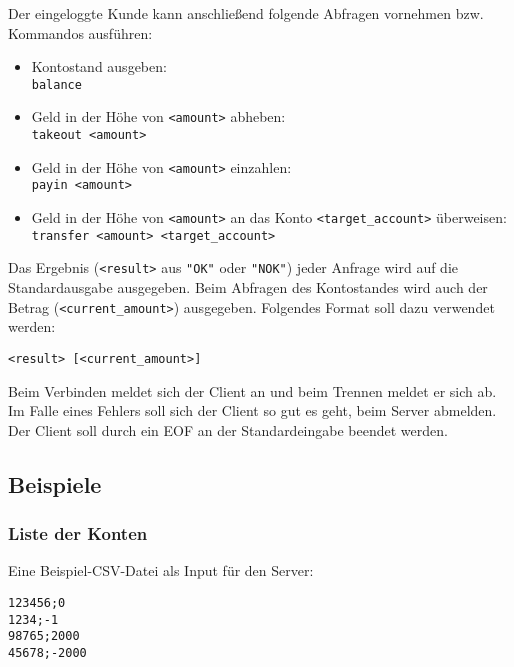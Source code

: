Der eingeloggte Kunde kann anschließend folgende Abfragen vornehmen
bzw. Kommandos ausführen:
\begin{itemize}
\item Kontostand ausgeben:\\
  \texttt{balance}
\item Geld in der Höhe von \texttt{<amount>} abheben:\\
  \texttt{takeout <amount>}
\item Geld in der Höhe von \texttt{<amount>} einzahlen:\\
  \texttt{payin <amount>}
\item Geld in der Höhe von \texttt{<amount>} an das Konto
  \verb|<target_account>| überweisen:\\
  \verb|transfer <amount> <target_account>|
\end{itemize}
%
Das Ergebnis (\texttt{<result>} aus \texttt{"{}OK"{}} oder \texttt{"{}NOK"{}})
jeder Anfrage wird auf die Standardausgabe ausgegeben. Beim Abfragen des
Kontostandes wird auch der Betrag (\verb|<current_amount>|)
ausgegeben. Folgendes Format soll dazu verwendet werden:
\begin{verbatim}
<result> [<current_amount>]
\end{verbatim}

Beim Verbinden meldet sich der Client an und beim Trennen meldet er sich ab. Im
Falle eines Fehlers soll sich der Client so gut es geht, beim Server abmelden.
Der Client soll durch ein EOF an der Standardeingabe beendet werden.

\subsection*{Beispiele}

\subsubsection*{Liste der Konten}
Eine Beispiel-CSV-Datei als Input für den Server:
\begin{verbatim}
123456;0
1234;-1
98765;2000
45678;-2000
\end{verbatim}

